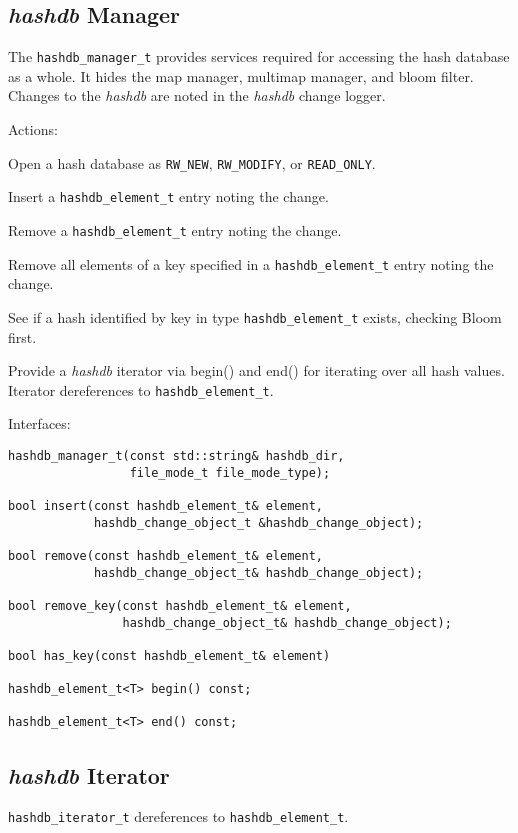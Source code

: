 \documentclass[12pt,twoside]{article}
\newcommand{\hdb}{\emph{hashdb}\xspace}
\begin{document}
\subsection{\hdb Manager}
The \texttt{hashdb\_manager\_t}
provides services required for accessing the hash database
as a whole.  It hides the map manager, multimap manager, and bloom filter.
Changes to the \hdb are noted in the \hdb change logger.

Actions:
\begin{compactitem}
\item Open a hash database as
\texttt{RW\_NEW}, \texttt{RW\_MODIFY}, or \texttt{READ\_ONLY}.
\item Insert a \texttt{hashdb\_element\_t} entry noting the change.
\item Remove a \texttt{hashdb\_element\_t} entry noting the change.
\item Remove all elements of a key
specified in a \texttt{hashdb\_element\_t} entry noting the change.
\item See if a hash identified by key in
type \texttt{hashdb\_element\_t} exists, checking Bloom first.
\item Provide a \hdb iterator via begin() and end()
for iterating over all hash values.
Iterator dereferences to \texttt{hashdb\_element\_t}.
\end{compactitem}

Interfaces:

\begin{small}
\begin{verbatim}
hashdb_manager_t(const std::string& hashdb_dir,
                 file_mode_t file_mode_type);

bool insert(const hashdb_element_t& element,
            hashdb_change_object_t &hashdb_change_object);

bool remove(const hashdb_element_t& element,
            hashdb_change_object_t& hashdb_change_object);

bool remove_key(const hashdb_element_t& element,
                hashdb_change_object_t& hashdb_change_object);

bool has_key(const hashdb_element_t& element)

hashdb_element_t<T> begin() const;

hashdb_element_t<T> end() const;
\end{verbatim}
\end{small}

\subsection{\hdb Iterator}
\texttt{hashdb\_iterator\_t} dereferences to \texttt{hashdb\_element\_t}.
\end{document}
